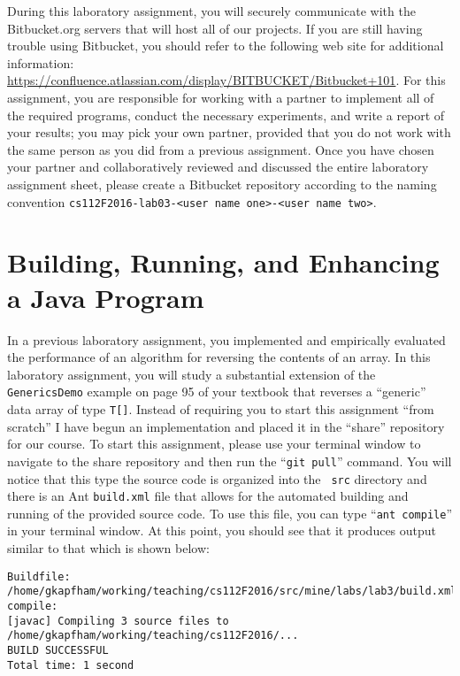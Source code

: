 During this laboratory assignment, you will securely communicate with the Bitbucket.org servers that will host all of
our projects.  If you are still having trouble using Bitbucket, you should refer to the following web site for
additional information: \url{https://confluence.atlassian.com/display/BITBUCKET/Bitbucket+101}.  For this assignment,
you are responsible for working with a partner to implement all of the required programs, conduct the necessary
experiments, and write a report of your results; you may pick your own partner, provided that you do not work with the
same person as you did from a previous assignment. Once you have chosen your partner and collaboratively reviewed and
discussed the entire laboratory assignment sheet, please create a Bitbucket repository according to the naming
convention {\tt cs112F2016-lab03-<user name one>-<user name two>}.

\section*{Building, Running, and Enhancing a Java Program}

In a previous laboratory assignment, you implemented and empirically evaluated the performance of an algorithm for
reversing the contents of an array. In this laboratory assignment, you will study a substantial extension of the {\tt
GenericsDemo} example on page 95 of your textbook that reverses a ``generic'' data array of type {\tt T[]}. Instead of
requiring you to start this assignment ``from scratch'' I have begun an implementation and placed it in the ``share''
repository for our course. To start this assignment, please use your terminal window to navigate to the share repository
and then run the ``{\tt git pull}'' command. You will notice that this type the source code is organized into the {\tt
src} directory and there is an Ant {\tt build.xml} file that allows for the automated building and running of the
provided source code. To use this file, you can type ``{\tt ant compile}'' in your terminal window. At this point, you
should see that it produces output similar to that which is shown below:

\vspace*{-.1in}

\begin{verbatim}
Buildfile: /home/gkapfham/working/teaching/cs112F2016/src/mine/labs/lab3/build.xml
compile:
[javac] Compiling 3 source files to /home/gkapfham/working/teaching/cs112F2016/...
BUILD SUCCESSFUL
Total time: 1 second
\end{verbatim}

